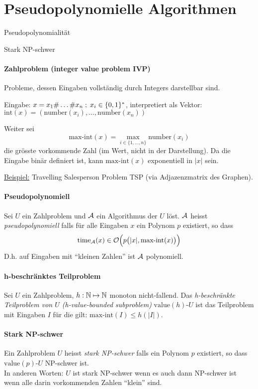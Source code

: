 \section{Pseudopolynomielle Algorithmen}

\begin{takeaway}
    \item Pseudopolynomialität
    \item Stark NP-schwer
\end{takeaway}

\paragraph{Zahlproblem (integer value problem IVP)}
Probleme, dessen Eingaben vollständig durch Integers darstellbar sind.

Eingabe: $x = x_1 \# \dots \# x_n \; ; \; x_i \in \lbrace 0, 1 \rbrace^*$, interpretiert als Vektor:
$\text{int}(x) = (\text{number}(x_i), \dots, \text{number}(x_n))$

Weiter sei 
\[ \text{max-int}(x) = \max_{i \in \{1, \dots, n\}} \text{number}(x_i) \]
die grösste vorkommende Zahl (im Wert, nicht in der Darstellung).
Da die  Eingabe binär definiert ist, kann $\text{max-int}(x)$ exponentiell in $|x|$ sein.

\underline{Beispiel:}
Travelling Salesperson Problem TSP (via Adjazenzmatrix des Graphen).

\paragraph{Pseudopolynomiell}
Sei $U$ ein Zahlproblem und $\mathcal{A}$ ein Algorithmus der $U$ löst.
$\mathcal{A}$ heisst \emph{pseudopolynomiell} falls für alle Eingaben $x$ ein Polynom $p$ existiert, so dass
\[ \text{time}_{\mathcal{A}} (x) \in \mathcal{O} \Big( p \big( |x| , \text{max-int}(x) \big) \Big) \]
D.h. auf Eingaben mit ``kleinen Zahlen'' ist $\mathcal{A}$ polynomiell.

\paragraph{h-beschränktes Teilproblem}
Sei $U$ ein Zahlproblem, $h: \mathbb{N} \mapsto \mathbb{N}$ monoton nicht-fallend.
Das \emph{h-beschränkte Teilproblem von $U$ (h-value-bounded subproblem)} $\text{value}(h)\text{-}U$
ist das Teilproblem mit Eingaben $I$ für die gilt: $\text{max-int}(I) \leq h(|I|)$.

\paragraph{Stark NP-schwer}
Ein Zahlproblem $U$ heisst \emph{stark NP-schwer} falls ein Polynom $p$ existiert, 
so dass $\text{value}(p)\text{-}U$ NP-schwer ist.
\\
In anderen Worten: $U$ ist stark NP-schwer wenn es auch dann NP-schwer ist wenn alle darin
vorkommenden Zahlen ``klein'' sind.

